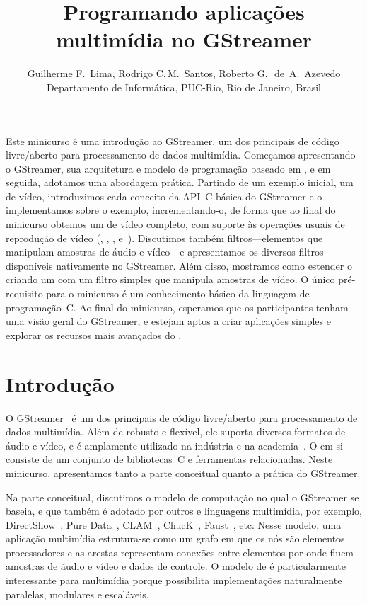 \documentclass{SBCbookchapter}
\title{Programando aplicações multimídia no GStreamer}
\author{%
  Guilherme F\null.~Lima,
  Rodrigo C\null.\,M.~Santos,
  Roberto G\null.\,~de~A.~Azevedo\\[\smallskipamount]
  \small{Departamento de Informática, PUC-Rio, Rio de Janeiro, Brasil}
}
\begin{document}
\maketitle
{}\baselineskip\strut
\begin{abstract}
  
\end{abstract}
\begin{resumo}
  Este minicurso é uma introdução ao GStreamer, um dos principais
   de código livre/aberto para processamento de dados
  multimídia.  Começamos apresentando o GStreamer, sua arquitetura e modelo
  de programação baseado em , e em seguida, adotamos uma
  abordagem prática.  Partindo de um exemplo inicial, um  de
  vídeo, introduzimos cada conceito da API~C básica do GStreamer e o
  implementamos sobre o exemplo, incrementando-o, de forma que ao final do
  minicurso obtemos um  de vídeo completo, com suporte às
  operações usuais de reprodução de vídeo (, , ,
   e~).  Discutimos também filtros---elementos
  que manipulam amostras de áudio e vídeo---e apresentamos os diversos
  filtros disponíveis nativamente no GStreamer.  Além disso, mostramos como
  estender o  criando um  com um filtro simples que
  manipula amostras de vídeo.  O único pré-requisito para o minicurso é um
  conhecimento básico da linguagem de programação~C\null.  Ao final do
  minicurso, esperamos que os participantes tenham uma visão geral do
  GStreamer, e estejam aptos a criar aplicações simples e explorar os
  recursos mais avançados do .
\end{resumo}


\section{Introdução}
\label{sec:intro}

O GStreamer~\cite{gstreamer} é um dos principais  de código
livre/aberto para processamento de dados multimídia.  Além de robusto e
flexível, ele suporta diversos formatos de áudio e vídeo, e é amplamente
utilizado na indústria e na academia~\cite{gstreamer-apps}.
O  em si consiste de um conjunto de bibliotecas~C e
ferramentas relacionadas.  Neste minicurso, apresentamos tanto a parte
conceitual quanto a prática do GStreamer.

Na parte conceitual, discutimos o modelo de computação  no qual
o GStreamer se baseia, e que também é adotado por outros  e
linguagens multimídia, por exemplo, DirectShow~\cite{Chatterjee-A-1997},
Pure Data~\cite{Puckette-M-S-2007}, CLAM~\cite{Amatriain-X-2008},
ChucK~\cite{Wang-G-2003}, Faust~\cite{Orlarey-Y-2009}, etc.  Nesse modelo,
uma aplicação multimídia estrutura-se como um grafo em que os nós são
elementos processadores e as arestas representam conexões entre elementos
por onde fluem amostras de áudio e vídeo e dados de controle.  O modelo de
 é particularmente interessante para multimídia porque
possibilita implementações naturalmente paralelas, modulares e escaláveis.
\end{document}
